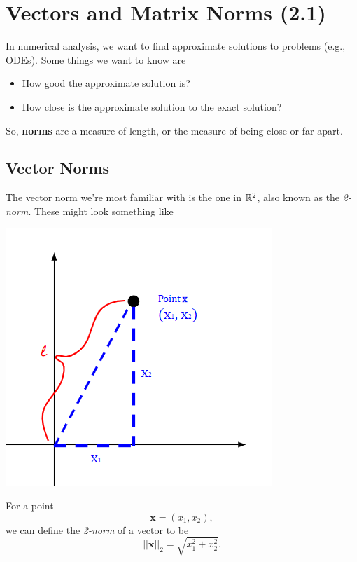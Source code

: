 \documentclass[letterpaper]{article}
\newcommand{\0}{\mathbf{0}}
\newcommand{\x}{\mathbf{x}}
\begin{document}
\section{Vectors and Matrix Norms (2.1)}
In numerical analysis, we want to find approximate solutions to problems (e.g., ODEs). Some things we want to know are 
\begin{itemize}
    \item How good the approximate solution is? 
    \item How close is the approximate solution to the exact solution? 
\end{itemize}
So, \textbf{norms} are a measure of length, or the measure of being close or far apart. 

\subsection{Vector Norms}
The vector norm we're most familiar with is the one in $\mathbb{R}^2$, also known as the \emph{2-norm}. These might look something like
\begin{center}
    \includegraphics[scale=0.9]{../assets/v_norm.png}
\end{center}
For a point \[\x = (x_1, x_2),\] we can define the \emph{2-norm} of a vector to be \[||\x||_2 = \sqrt{x_{1}^{2} + x_{2}^{2}}.\]
\end{document}
